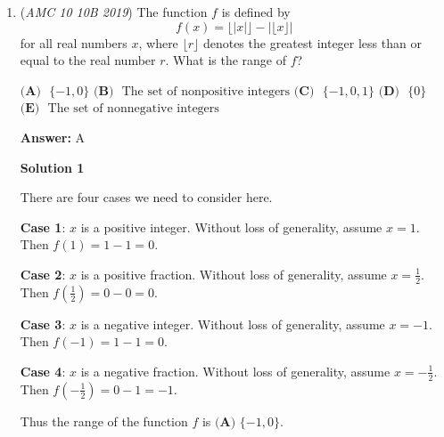 \begin{enumerate}
 -RuiyangWu

 



\textbf{Solution 5 (diagonals)}

Draw the two diagonals of the square. Notice that this splits the shaded region into 8 triangles of equal area.The triangles are equilateral and have length $2$, so their height is $\sqrt{3}$. Adding the two heights of the triangles together, we get the square's side length of $2\sqrt{3}$. Then we know that the length of the base of the shaded triangles is $\frac{2\sqrt{3}-2}{2}=\sqrt{3}-1$ and the height of the shaded triangle is the height of the equilateral triangle, $\sqrt{3}$, so the area is $8\cdot\left(\frac{\left(\sqrt{3}-1\right)\sqrt{3}}{2}\right)=4\left(\sqrt{3}-1\right)\sqrt{3}=12-4\sqrt{3}$ or $\boxed{\textbf{(B) }12 - 4\sqrt{3}}$.

 


	\item (\textit{AMC 10 10B 2019}) The function $f$ is defined by 
 \[f(x) = \lfloor|x|\rfloor - |\lfloor x \rfloor|\]for all real numbers $x$, where $\lfloor r \rfloor$ denotes the greatest integer less than or equal to the real number $r$. What is the range of $f$?


 $\textbf{(A) }$ $\{-1, 0\}$
$\textbf{(B) }$ $\text{The set of nonpositive integers}$
$\textbf{(C) }$ $\{-1, 0, 1\}$
$\textbf{(D) }$ $\{0\}$
$\textbf{(E) }$ $\text{The set of nonnegative integers}$

 \textbf{Answer: }A



\textbf{Solution 1}

There are four cases we need to consider here.

 \textbf{Case 1}: $x$ is a positive integer. Without loss of generality, assume $x=1$. Then $f(1) = 1 - 1 = 0$.

 \textbf{Case 2}: $x$ is a positive fraction. Without loss of generality, assume $x=\frac{1}{2}$. Then $f\left(\frac{1}{2}\right) = 0 - 0 = 0$.

 \textbf{Case 3}: $x$ is a negative integer. Without loss of generality, assume $x=-1$. Then $f(-1) = 1 - 1 = 0$.

 \textbf{Case 4}: $x$ is a negative fraction. Without loss of generality, assume $x=-\frac{1}{2}$. Then $f\left(-\frac{1}{2}\right) = 0 - 1 = -1$.

 Thus the range of the function $f$ is $\boxed{\textbf{(A) } \{-1, 0\}}$.

 




\end{enumerate}
